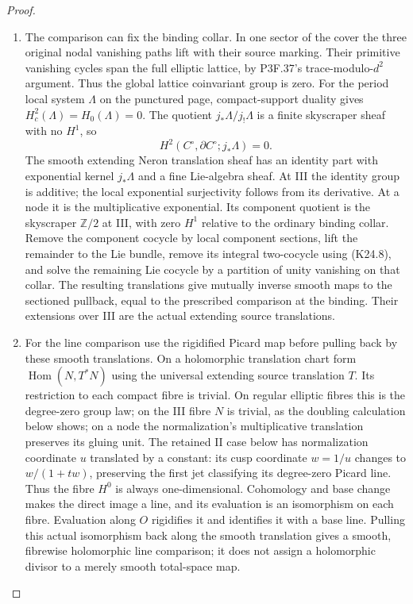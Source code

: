 \begin{proof}
\begin{enumerate}[label=\arabic*.]
\item The comparison can fix the binding collar. In one sector of
the cover the three original nodal vanishing paths lift with
their source marking. Their primitive vanishing cycles span
the full elliptic lattice, by P3F.37's trace-modulo-$d^2$
argument. Thus the global lattice coinvariant group is zero.
For the period local system $\Lambda$ on the punctured page,
compact-support duality gives $H_c^2(\Lambda)=H_0(\Lambda)=0$.
The quotient $j_*\Lambda/j_!\Lambda$ is a finite skyscraper
sheaf with no $H^1$, so
\[
             H^2(C^\circ,\partial C^\circ;j_*\Lambda)=0. \tag{K24.8}
\]
The smooth extending Neron translation sheaf has an identity
part with exponential kernel $j_*\Lambda$ and a fine
Lie-algebra sheaf. At III the identity group is additive;
the local exponential surjectivity follows from its derivative.
At a node it is the multiplicative exponential. Its component
quotient is the skyscraper $\mathbb Z/2$ at III, with zero
$H^1$ relative to the ordinary binding collar. Remove the
component cocycle by local component sections, lift the remainder
to the Lie bundle, remove its integral two-cocycle using (K24.8),
and solve the remaining Lie cocycle by a partition of unity
vanishing on that collar. The resulting translations give
mutually inverse smooth maps to the sectioned pullback, equal
to the prescribed comparison at the binding. Their extensions
over III are the actual extending source translations.

\item For the line comparison use the rigidified Picard map before
pulling back by these smooth translations. On a holomorphic
translation chart form $\operatorname{Hom}(N,T^*N)$ using
the universal extending source translation $T$. Its restriction
to each compact fibre is trivial. On regular elliptic fibres
this is the degree-zero group law; on the III fibre $N$ is
trivial, as the doubling calculation below shows; on a node
the normalization's multiplicative translation preserves its
gluing unit. The retained II case below has normalization
coordinate $u$ translated by a constant: its cusp coordinate
$w=1/u$ changes to $w/(1+tw)$, preserving the first jet
classifying its degree-zero Picard line. Thus the fibre $H^0$
is always one-dimensional. Cohomology and base change makes
the direct image a line, and its evaluation is an isomorphism
on each fibre. Evaluation along $O$ rigidifies it and identifies
it with a base line. Pulling this actual isomorphism back along
the smooth translation gives a smooth, fibrewise holomorphic
line comparison; it does not assign a holomorphic divisor to
a merely smooth total-space map.


\end{enumerate}
\end{proof}
